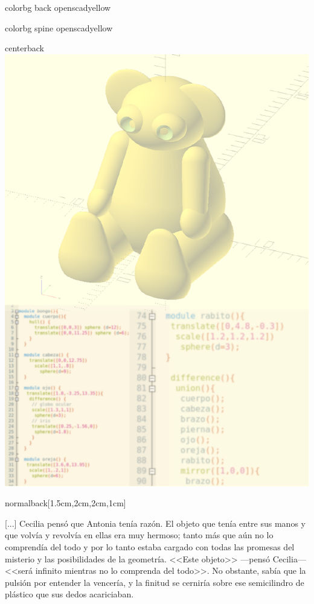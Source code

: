 \documentclass[coverheight=210mm,coverwidth=148.5mm, bleedwidth=23mm, %
spinewidth=23mm, foldingmargin, marklength=4mm, 11pt]{bookcover}
\begin{document}
\begin{bookcover}

   \begin{bookcoverelement}{color}{bg back}
     openscadyellow
   \end{bookcoverelement}
   \begin{bookcoverelement}{color}{bg spine}
     openscadyellow
   \end{bookcoverelement}


  \begin{bookcoverelement}{center}{back}
    \includegraphics{contratapa-A5.pdf}
  \end{bookcoverelement}


  \begin{bookcoverelement}{normal}{back}[1.5cm,2cm,2cm,1cm]
    {\large

      \hspace{.5em} [...] Cecilia pensó que Antonia tenía
      razón. El objeto que tenía entre sus manos y que volvía y
      revolvía en ellas era muy hermoso; tanto más que aún no lo
      comprendía del todo y por lo tanto estaba cargado con todas las
      promesas del misterio y las posibilidades de la
      geometría. <<Este objeto>> ---pensó Cecilia--- <<será infinito
      mientras no lo comprenda del todo>>. No obstante, sabía que la
      pulsión por entender la vencería, y la finitud se cerniría sobre
      ese semicilindro de plástico que sus dedos acariciaban.

}
\end{bookcoverelement}
\end{bookcover}
\end{document}
